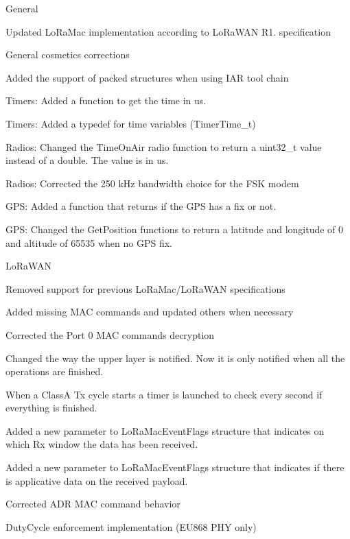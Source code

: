 \begin{DoxyItemize}
\item General
\begin{DoxyEnumerate}
\item Updated Lo\+Ra\+Mac implementation according to Lo\+Ra\+W\+AN R1. specification
\item General cosmetics corrections
\item Added the support of packed structures when using I\+AR tool chain
\item Timers\+: Added a function to get the time in us.
\item Timers\+: Added a typedef for time variables (Timer\+Time\+\_\+t)
\item Radios\+: Changed the Time\+On\+Air radio function to return a uint32\+\_\+t value instead of a double. The value is in us.
\item Radios\+: Corrected the 250 k\+Hz bandwidth choice for the F\+SK modem
\item G\+PS\+: Added a function that returns if the G\+PS has a fix or not.
\item G\+PS\+: Changed the Get\+Position functions to return a latitude and longitude of 0 and altitude of 65535 when no G\+PS fix.
\end{DoxyEnumerate}
\item Lo\+Ra\+W\+AN
\begin{DoxyEnumerate}
\item Removed support for previous Lo\+Ra\+Mac/\+Lo\+Ra\+W\+AN specifications
\item Added missing M\+AC commands and updated others when necessary
\begin{DoxyItemize}
\item Corrected the Port 0 M\+AC commands decryption
\item Changed the way the upper layer is notified. Now it is only notified when all the operations are finished.

When a ClassA Tx cycle starts a timer is launched to check every second if everything is finished.
\item Added a new parameter to Lo\+Ra\+Mac\+Event\+Flags structure that indicates on which Rx window the data has been received.
\item Added a new parameter to Lo\+Ra\+Mac\+Event\+Flags structure that indicates if there is applicative data on the received payload.
\item Corrected A\+DR M\+AC command behavior
\item Duty\+Cycle enforcement implementation (E\+U868 P\+HY only)


\end{DoxyItemize}
\end{DoxyEnumerate}
\end{DoxyItemize}
